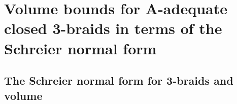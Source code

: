 \documentclass{article}
\begin{document}
%
%
%
%
%
%
%
%
%
%
%
%
%
%













\section{Volume bounds for A-adequate closed 3-braids in terms of the Schreier normal form}


\subsection{The Schreier normal form for 3-braids and volume}
\label{normformsec}
\end{document}

